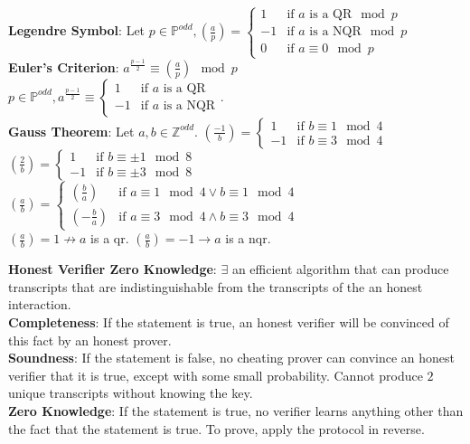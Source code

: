 \documentclass[10pt]{article}
\begin{document}
\begin{multicols}{2}
        \noindent
        \textbf{Legendre Symbol}: Let $p\in\mathbb{P}^{odd},\left(\frac{a}{p}\right)=\begin{cases}
        1  & \text{if } a \text{ is a QR}\mod{p}  \\
        -1 & \text{if } a \text{ is a NQR}\mod{p} \\
        0  & \text{if } a\equiv 0\mod{p}
    \end{cases}$\\
        \textbf{Euler's Criterion}: $a^{\frac{p-1}{2}}\equiv\left(\frac{a}{p}\right)\mod{p}$\\
    $p\in \mathbb{P}^{odd},a^{\frac{p-1}{2}}\equiv\begin{cases}
        1  & \text{if } a \text{ is a QR}  \\
        -1 & \text{if } a \text{ is a NQR}
    \end{cases}$.\\
        \textbf{Gauss Theorem}: Let $a,b\in\mathbb{Z}^{odd}$. $\left(\frac{-1}{b}\right)=\begin{cases}
        1  & \text{if } b\equiv1\mod{4} \\
        -1 & \text{if } b\equiv3\mod{4}
    \end{cases}$\\
    $\left(\frac{2}{b}\right)=\begin{cases}
        1  & \text{if } b\equiv\pm1\mod{8} \\
        -1 & \text{if } b\equiv\pm3\mod{8}
    \end{cases}$\\
    $\left(\frac{a}{b}\right)=\begin{cases}
        \left(\frac{b}{a}\right)  & \text{if } a\equiv1\mod{4}\lor b\equiv1\mod{4}  \\
        \left(-\frac{b}{a}\right) & \text{if } a\equiv3\mod{4}\land b\equiv3\mod{4}
    \end{cases}$\\
    $\left(\frac{a}{b}\right)=1\not\rightarrow a$ is a qr. $\left(\frac{a}{b}\right)=-1\rightarrow a$ is a nqr.

        \noindent
        \textbf{Honest Verifier Zero Knowledge}: $\exists$ an efficient algorithm that can produce transcripts that are indistinguishable from the transcripts of the an honest interaction.\\
        \textbf{Completeness}: If the statement is true, an honest verifier will be convinced of this fact by an honest prover.\\
        \textbf{Soundness}: If the statement is false, no cheating prover can convince an honest verifier that it is true, except with some small probability. Cannot produce $2$ unique transcripts without knowing the key.\\
        \textbf{Zero Knowledge}: If the statement is true, no verifier learns anything other than the fact that the statement is true. To prove, apply the protocol in reverse.


\end{multicols}
\end{document}
